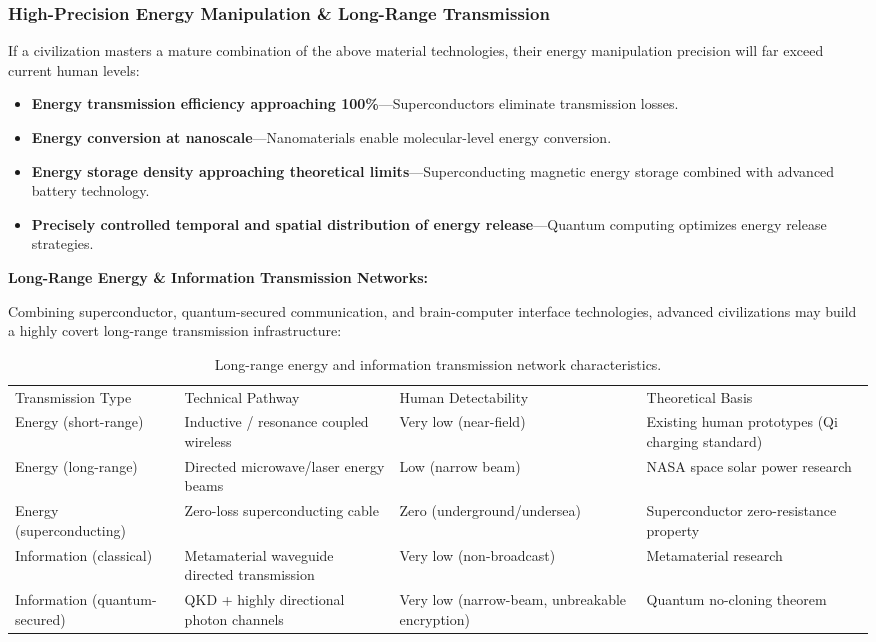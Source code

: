 \documentclass[aps,prd,twocolumn,superscriptaddress,nofootinbib]{revtex4-2}
\begin{document}
\subsubsection{High-Precision Energy Manipulation \& Long-Range Transmission}\label{sec:energy-manipulation}

If a civilization masters a mature combination of the above material technologies, their energy manipulation precision will far exceed current human levels:

\begin{itemize}
  \item \textbf{Energy transmission efficiency approaching 100\%}---Superconductors eliminate transmission losses.
  \item \textbf{Energy conversion at nanoscale}---Nanomaterials enable molecular-level energy conversion.
  \item \textbf{Energy storage density approaching theoretical limits}---Superconducting magnetic energy storage combined with advanced battery technology.
  \item \textbf{Precisely controlled temporal and spatial distribution of energy release}---Quantum computing optimizes energy release strategies.
\end{itemize}

\textbf{Long-Range Energy \& Information Transmission Networks:}

Combining superconductor, quantum-secured communication, and brain-computer interface technologies, advanced civilizations may build a highly covert long-range transmission infrastructure:

\begin{table}[htbp]
\caption{Long-range energy and information transmission network characteristics.}
\label{tab:transmission-network}
\begin{ruledtabular}
\begin{tabular}{llll}
Transmission Type & Technical Pathway & Human Detectability & Theoretical Basis \\
\colrule
Energy (short-range) & Inductive / resonance coupled wireless & Very low (near-field) & Existing human prototypes (Qi charging standard) \\
Energy (long-range) & Directed microwave/laser energy beams & Low (narrow beam) & NASA space solar power research \\
Energy (superconducting) & Zero-loss superconducting cable & Zero (underground/undersea) & Superconductor zero-resistance property \\
Information (classical) & Metamaterial waveguide directed transmission & Very low (non-broadcast) & Metamaterial research \\
Information (quantum-secured) & QKD + highly directional photon channels & Very low (narrow-beam, unbreakable encryption) & Quantum no-cloning theorem \\
\end{tabular}
\end{ruledtabular}
\end{table}
\end{document}

